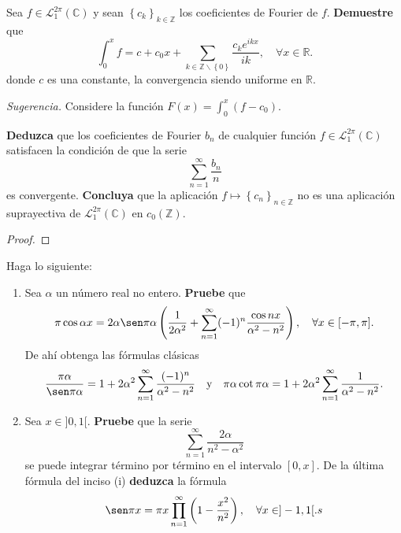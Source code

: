 \documentclass[12pt]{report}
\theoremstyle{largebreak}
\begin{document}
    \begin{excer}
        Sea $f\in\mathcal{L}_1^{2\pi}(\mathbb{C})$ y sean $\left\{c_k \right\}_{ k\in\mathbb{Z}}$ los coeficientes de Fourier de $f$. \textbf{Demuestre} que
        \begin{equation*}
            \int_0^x f=c+c_0x+\sum_{ k\in\mathbb{Z}\backslash\left\{0\right\}}\frac{c_ke^{ ikx}}{ik},\quad\forall x\in\mathbb{R}.
        \end{equation*}
        donde $c$ es una constante, la convergencia siendo uniforme en $\mathbb{R}$.

        \textit{Sugerencia.} Considere la función $F(x)=\int_0^x (f-c_0)$.

        \textbf{Deduzca} que los coeficientes de Fourier $b_n$ de cualquier función $f\in\mathcal{L}_1^{2\pi}(\mathbb{C})$ satisfacen la condición de que la serie
        \begin{equation*}
            \sum_{ n=1}^\infty\frac{b_n}{n}
        \end{equation*}
        es convergente. \textbf{Concluya} que la aplicación $f\mapsto\left\{c_n \right\}_{ n\in\mathbb{Z}}$ no es una aplicación suprayectiva de $\mathcal{L}_1^{2\pi}(\mathbb{C})$ en $c_0(\mathbb{Z})$.
    \end{excer}

    \begin{proof}
        
    \end{proof}

    \begin{excer}
        Haga lo siguiente:
        \begin{enumerate}
            \item Sea $\alpha$ un número real no entero. \textbf{Pruebe} que
            \begin{equation*}
                \pi\cos\alpha x=2\alpha\sen\pi\alpha\left(\frac{1}{2\alpha^2}+\sum_{ n=1}^\infty(-1)^n\frac{\cos nx}{\alpha^2-n^2} \right),\quad\forall x\in[-\pi,\pi].
            \end{equation*}
            De ahí obtenga las fórmulas clásicas
            \begin{equation*}
                \frac{\pi\alpha}{\sen\pi\alpha}=1+2\alpha^2\sum_{ n=1}^\infty\frac{(-1)^n}{\alpha^2-n^2}\quad\textup{y}\quad\pi\alpha\cot\pi\alpha=1+2\alpha^2\sum_{ n=1}^\infty\frac{1}{\alpha^2-n^2}.
            \end{equation*}
            \item Sea $x\in]0,1[$. \textbf{Pruebe} que la serie
            \begin{equation*}
                \sum_{ n=1}^\infty\frac{2\alpha}{n^2-\alpha^2}
            \end{equation*}
            se puede integrar término por término en el intervalo $[0,x]$. De la última fórmula del inciso (i) \textbf{deduzca} la fórmula
            \begin{equation*}
                \sen\pi x=\pi x\prod_{ n=1}^\infty\left(1-\frac{x^2}{n^2} \right),\quad\forall x\in]-1,1[.s
            \end{equation*}
        \end{enumerate}
    \end{excer}
\end{document}
